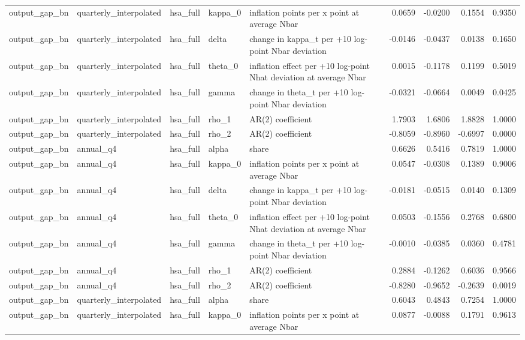 \begin{tabular}{lllllrrrr}
output\_gap\_bn & quarterly\_interpolated & hsa\_full & kappa\_0 & inflation points per x point at average Nbar & 0.0659 & -0.0200 & 0.1554 & 0.9350 \\
output\_gap\_bn & quarterly\_interpolated & hsa\_full & delta & change in kappa\_t per +10 log-point Nbar deviation & -0.0146 & -0.0437 & 0.0138 & 0.1650 \\
output\_gap\_bn & quarterly\_interpolated & hsa\_full & theta\_0 & inflation effect per +10 log-point Nhat deviation at average Nbar & 0.0015 & -0.1178 & 0.1199 & 0.5019 \\
output\_gap\_bn & quarterly\_interpolated & hsa\_full & gamma & change in theta\_t per +10 log-point Nbar deviation & -0.0321 & -0.0664 & 0.0049 & 0.0425 \\
output\_gap\_bn & quarterly\_interpolated & hsa\_full & rho\_1 & AR(2) coefficient & 1.7903 & 1.6806 & 1.8828 & 1.0000 \\
output\_gap\_bn & quarterly\_interpolated & hsa\_full & rho\_2 & AR(2) coefficient & -0.8059 & -0.8960 & -0.6997 & 0.0000 \\
output\_gap\_bn & annual\_q4 & hsa\_full & alpha & share & 0.6626 & 0.5416 & 0.7819 & 1.0000 \\
output\_gap\_bn & annual\_q4 & hsa\_full & kappa\_0 & inflation points per x point at average Nbar & 0.0547 & -0.0308 & 0.1389 & 0.9006 \\
output\_gap\_bn & annual\_q4 & hsa\_full & delta & change in kappa\_t per +10 log-point Nbar deviation & -0.0181 & -0.0515 & 0.0140 & 0.1309 \\
output\_gap\_bn & annual\_q4 & hsa\_full & theta\_0 & inflation effect per +10 log-point Nhat deviation at average Nbar & 0.0503 & -0.1556 & 0.2768 & 0.6800 \\
output\_gap\_bn & annual\_q4 & hsa\_full & gamma & change in theta\_t per +10 log-point Nbar deviation & -0.0010 & -0.0385 & 0.0360 & 0.4781 \\
output\_gap\_bn & annual\_q4 & hsa\_full & rho\_1 & AR(2) coefficient & 0.2884 & -0.1262 & 0.6036 & 0.9566 \\
output\_gap\_bn & annual\_q4 & hsa\_full & rho\_2 & AR(2) coefficient & -0.8280 & -0.9652 & -0.2639 & 0.0019 \\
output\_gap\_bn & quarterly\_interpolated & hsa\_full & alpha & share & 0.6043 & 0.4843 & 0.7254 & 1.0000 \\
output\_gap\_bn & quarterly\_interpolated & hsa\_full & kappa\_0 & inflation points per x point at average Nbar & 0.0877 & -0.0088 & 0.1791 & 0.9613 \\

\end{tabular}
